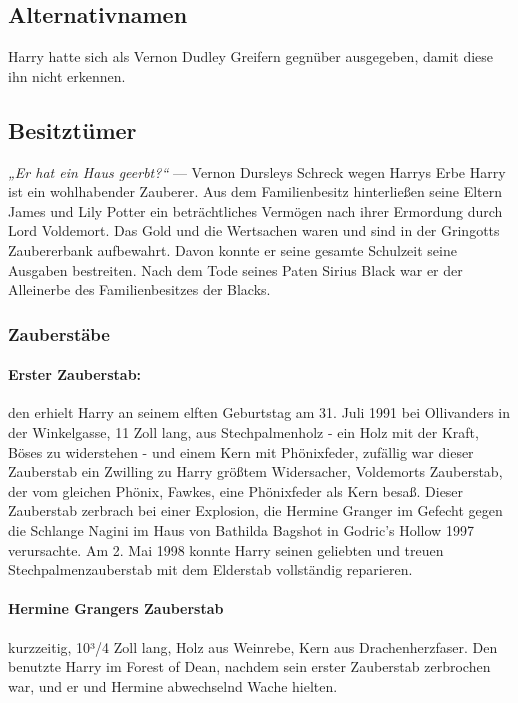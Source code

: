 \documentclass[a4paper, 10pt]{article}
\begin{document}
\subsection*{\Large Alternativnamen}
Harry hatte sich als Vernon Dudley Greifern gegnüber ausgegeben, damit diese ihn nicht erkennen.
\subsection*{\Large Besitztümer}
\textit{„Er hat ein Haus geerbt?“}
\vspace{10pt}
\newline
— Vernon Dursleys Schreck wegen Harrys Erbe
\vspace{10pt}
\newline
Harry ist ein wohlhabender Zauberer. Aus dem Familienbesitz hinterließen seine Eltern James und Lily Potter ein beträchtliches
Vermögen nach ihrer Ermordung durch Lord Voldemort. Das Gold und die Wertsachen waren und sind in der Gringotts Zaubererbank aufbewahrt. Davon konnte er seine gesamte Schulzeit seine Ausgaben bestreiten. Nach dem Tode seines Paten Sirius Black war er der Alleinerbe des Familienbesitzes der Blacks.
\subsubsection*{\large Zauberstäbe}
\paragraph{Erster Zauberstab:}
den erhielt Harry an seinem elften Geburtstag am 31. Juli 1991 bei Ollivanders in der Winkelgasse, 11 Zoll lang, aus Stechpalmenholz - ein Holz mit der Kraft, Böses zu widerstehen - und einem Kern mit Phönixfeder, zufällig war dieser Zauberstab ein Zwilling zu Harry größtem Widersacher, Voldemorts Zauberstab, der vom gleichen Phönix, Fawkes, eine Phönixfeder als Kern besaß. Dieser Zauberstab zerbrach bei einer Explosion, die Hermine Granger im Gefecht gegen die Schlange Nagini im Haus von Bathilda Bagshot in Godric's Hollow 1997 verursachte. Am 2. Mai 1998 konnte Harry seinen geliebten und treuen Stechpalmenzauberstab mit dem Elderstab vollständig reparieren.
\paragraph{Hermine Grangers Zauberstab}
kurzzeitig, 10³/4 Zoll lang, Holz aus Weinrebe, Kern aus Drachenherzfaser. Den benutzte Harry im Forest of Dean, nachdem sein erster Zauberstab zerbrochen war, und er und Hermine abwechselnd Wache hielten.
\end{document}
